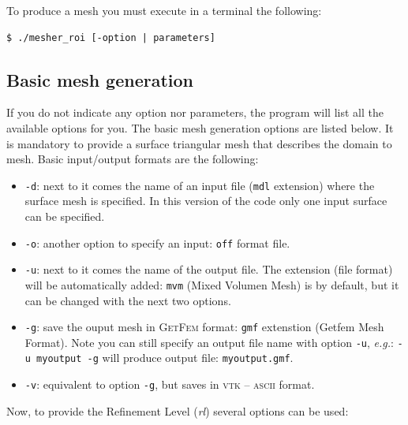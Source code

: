 \documentclass[10pt]{article}
\begin{document}
To produce a mesh you must execute in a terminal the following:

{\small
\begin{verbatim}
$ ./mesher_roi [-option | parameters]
\end{verbatim}
}

\subsection{Basic mesh generation}
\label{generatemesh}

If you do not indicate any option nor parameters, the program will list all the available options for you. The basic mesh generation options are listed below. It is mandatory to provide a surface triangular mesh that describes the domain to mesh. Basic input/output formats are the following:

\begin{itemize}
\item \texttt{-d}: next to it comes the name of an input file (\texttt{mdl} extension) where the surface mesh is specified. In this version of the code only one input surface can be specified.
\item \texttt{-o}: another option to specify an input: \texttt{off} format file.
\item \texttt{-u}: next to it comes the name of the output file. The extension (file format) will be automatically added: \texttt{mvm} (Mixed Volumen Mesh) is by default, but it can be changed with the next two options.
\item \texttt{-g}: save the ouput mesh in \textsc{GetFem} format: \texttt{gmf} extenstion (Getfem Mesh Format). Note you can still specify an output file name with option \texttt{-u}, \textit{e.g.}: \texttt{-u myoutput -g} will produce output file: \texttt{myoutput.gmf}.
\item \texttt{-v}: equivalent to option \texttt{-g}, but saves in \textsc{vtk -- ascii} format.
\end{itemize}

Now, to provide the Refinement Level (\textit{rl}) several options can be used:
\end{document}
